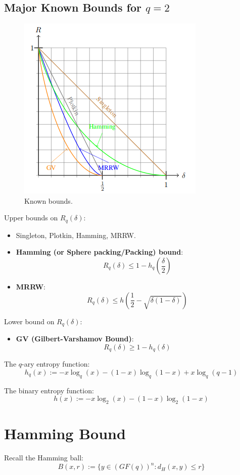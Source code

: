 \documentclass[11pt]{article}
\begin{document}
\subsection{Major Known Bounds for $q = 2$}
\begin{figure}[h]
  \caption{Known bounds.}
  \includegraphics[scale=0.4]{bounds}
  \centering
\end{figure}

Upper bounds on $R_q(\delta)$:
\begin{itemize}
    \item Singleton, Plotkin, Hamming, MRRW.
    \item \textbf{Hamming (or Sphere packing/Packing) bound}:
      \[
        R_q(\delta) \leq 1 - h_q\left(\frac{\delta}{2}\right)
      \]
    \item \textbf{MRRW}:
      \[
        R_q(\delta) \leq h\left(\frac{1}{2} - \sqrt{\delta (1 - \delta)}\right)
      \]
\end{itemize}

Lower bound on $R_q(\delta)$:
\begin{itemize}
  \item \textbf{GV (Gilbert-Varshamov Bound)}:
    \[
      R_q(\delta) \geq 1 - h_q(\delta)
    \]
\end{itemize}

The $q$-ary entropy function:
\[
  h_q(x) := -x\log_q(x) - (1 - x)\log_q(1 - x) + x\log_q(q - 1)
\]

The binary entropy function:
\[
  h(x) := -x\log_2(x) - (1 - x)\log_2(1 - x)
\]

\section{Hamming Bound}
Recall the Hamming ball:
\[
  B(x, r) := \{ y \in (GF(q))^n : d_H(x, y) \leq r \}
\]
\end{document}

